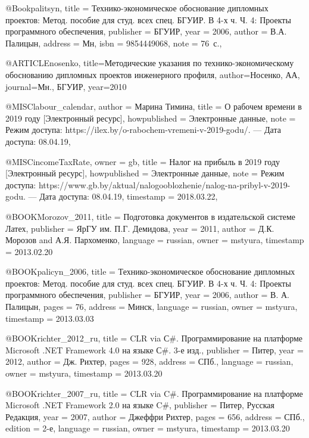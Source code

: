 @Book{palitsyn,
  title     = {Технико-экономическое обоснование дипломных проектов: Метод. пособие для студ. всех спец. БГУИР. В 4-х ч. Ч. 4: Проекты программного обеспечения},
  publisher = {БГУИР},
  year      = {2006},
  author    = {В.А. Палицын},
  address   = {Мн},
  isbn      = {9854449068},
  note      = {76~с.},
}

@ARTICLE{nosenko,
  title={Методические указания по технико-экономическому обоснованию дипломных проектов инженерного профиля},
  author={Носенко, АА},
  journal={Мн., БГУИР},
  year={2010}
}

@MISC{labour_calendar,
  author       = {Марина Тимина},
  title        = {О рабочем времени в 2019 году [Электронный ресурс]},
  howpublished = {Электронные данные},
  note         = {Режим доступа: https://ilex.by/o-rabochem-vremeni-v-2019-godu/. --- Дата доступа: 08.04.19},
}

@MISC{incomeTaxRate,
  owner = {gb},
  title = {Налог на прибыль в 2019 году [Электронный ресурс]},
  howpublished = {Электронные данные},
  note = {Режим доступа: https://www.gb.by/aktual/nalogooblozhenie/nalog-na-pribyl-v-2019-godu. --- Дата доступа: 08.04.19},
  timestamp = {2018.03.22},
}

@BOOK{Morozov_2011,
  title = {Подготовка документов в издательской системе Латех},
  publisher = {ЯрГУ им. П.Г. Демидова},
  year = {2011},
  author = {Д.К. Морозов and А.Я. Пархоменко},
  language = {russian},
  owner = {mstyura},
  timestamp = {2013.02.20}
}

@BOOK{palicyn_2006,
  title = {Технико-экономическое обоснование дипломных проектов: Метод. пособие
	для студ. всех спец. БГУИР. В 4-х ч. Ч. 4: Проекты программного обеспечения},
  publisher = {БГУИР},
  year = {2006},
  author = {В. А. Палицын},
  pages = {76},
  address = {Минск},
  language = {russian},
  owner = {mstyura},
  timestamp = {2013.03.03}
}

@BOOK{richter_2012_ru,
  title = {CLR via С\#. Программирование на платформе Microsoft .NET Framework
	4.0 на языке С\#. 3-е изд.},
  publisher = {Питер},
  year = {2012},
  author = {Дж. Рихтер},
  pages = {928},
  address = {СПб.},
  language = {russian},
  owner = {mstyura},
  timestamp = {2013.03.20}
}

@BOOK{richter_2007_ru,
  title = {CLR via C\#. Программирование на платформе Microsoft .NET Framework
	2.0 на языке C\#},
  publisher = {Питер, Русская Редакция},
  year = {2007},
  author = {Джеффри Рихтер},
  pages = {656},
  address = {СПб.},
  edition = {2-е},
  language = {russian},
  owner = {mstyura},
  timestamp = {2013.03.20}
}

